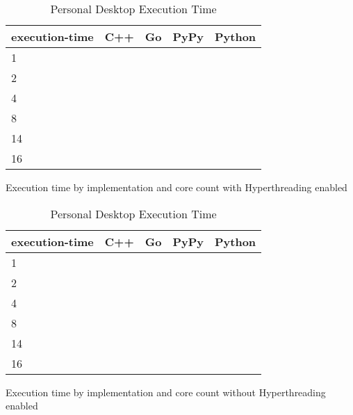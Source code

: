 \begin{table}[H]
    \centering
    \begin{tabular}{lrrrr}
        \hline
        execution-time & C++                 & Go          & PyPy       & Python              \\
        \hline
        1              &                     &             &            &                    \\
        2              &                     &             &            &                    \\
        4              &                     &             &            &                    \\
        8	           &                     &             &            &                    \\
        14             &                     &             &            &                    \\
        16             &                     &             &            &                    \\
        \hline
    \end{tabular}
\caption{Personal Desktop Execution Time}{Execution time by implementation and core count with Hyperthreading enabled}
\label{tab:desktop-execution-time-hyperthreading}
\end{table}

\begin{table}[H]
    \centering
    \begin{tabular}{lrrrr}
        \hline
        execution-time & C++                 & Go          & PyPy       & Python              \\
        \hline
        1              &                     &             &            &                    \\
        2              &                     &             &            &                    \\
        4              &                     &             &            &                    \\
        8	           &                     &             &            &                    \\
        14             &                     &             &            &                    \\
        16             &                     &             &            &                    \\
        \hline
    \end{tabular}
\caption{Personal Desktop Execution Time}{Execution time by implementation and core count without Hyperthreading enabled}
\label{tab:desktop-execution-time}
\end{table}

